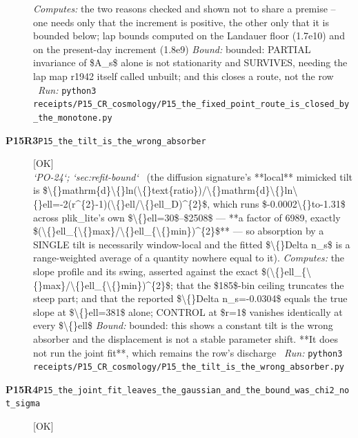 \begin{description}
\emph{Computes:} the two reasons checked and shown not to share a premise -- one needs only that the increment is positive, the other only that it is bounded below; lap bounds computed on the Landauer floor (1.7e10) and on the present-day increment (1.8e9)
 \emph{Bound:} bounded: PARTIAL invariance of \$A\_s\$ alone is not stationarity and SURVIVES, needing the lap map r1942 itself called unbuilt; and this closes a route, not the row
\ \emph{Run:} \texttt{python3 receipts/P15\_CR\_cosmology/P15\_the\_fixed\_point\_route\_is\_closed\_by\_the\_monotone.py}
\item[\rcptlabel{P15_the_tilt_is_the_wrong_absorber}{P15R3}\textbf{P15R3}\quad\texttt{P15\_the\_tilt\_is\_the\_wrong\_absorber}]\hfill\textsf{[OK]}\\
\textit{`PO-24`; `sec:refit-bound`} \ (the diffusion signature's **local** mimicked tilt is \$\textbackslash\{\}mathrm\{d\}\textbackslash\{\}ln(\textbackslash\{\}text\{ratio\})/\textbackslash\{\}mathrm\{d\}\textbackslash\{\}ln\textbackslash\{\}ell=-2(r\textasciicircum{}\{2\}-1)(\textbackslash\{\}ell/\textbackslash\{\}ell\_D)\textasciicircum{}\{2\}\$, which runs \$-0.0002\textbackslash\{\}to-1.31\$ across plik\_lite's own \$\textbackslash\{\}ell=30\$--\$2508\$ --- **a factor of 6989, exactly \$(\textbackslash\{\}ell\_\{\textbackslash\{\}max\}/\textbackslash\{\}ell\_\{\textbackslash\{\}min\})\textasciicircum{}\{2\}\$** --- so absorption by a SINGLE tilt is necessarily window-local and the fitted \$\textbackslash\{\}Delta n\_s\$ is a range-weighted average of a quantity nowhere equal to it). 
\emph{Computes:} the slope profile and its swing, asserted against the exact \$(\textbackslash\{\}ell\_\{\textbackslash\{\}max\}/\textbackslash\{\}ell\_\{\textbackslash\{\}min\})\textasciicircum{}\{2\}\$; that the \$185\$-bin ceiling truncates the steep part; and that the reported \$\textbackslash\{\}Delta n\_s=-0.0304\$ equals the true slope at \$\textbackslash\{\}ell=381\$ alone; CONTROL at \$r=1\$ vanishes identically at every \$\textbackslash\{\}ell\$
 \emph{Bound:} bounded: this shows a constant tilt is the wrong absorber and the displacement is not a stable parameter shift. **It does not run the joint fit**, which remains the row's discharge
\ \emph{Run:} \texttt{python3 receipts/P15\_CR\_cosmology/P15\_the\_tilt\_is\_the\_wrong\_absorber.py}
\item[\rcptlabel{P15_the_joint_fit_leaves_the_gaussian_and_the_bound_was_chi2_not_sigma}{P15R4}\textbf{P15R4}\quad\texttt{P15\_the\_joint\_fit\_leaves\_the\_gaussian\_and\_the\_bound\_was\_chi2\_not\_sigma}]\hfill\textsf{[OK]}\\

\end{description}
